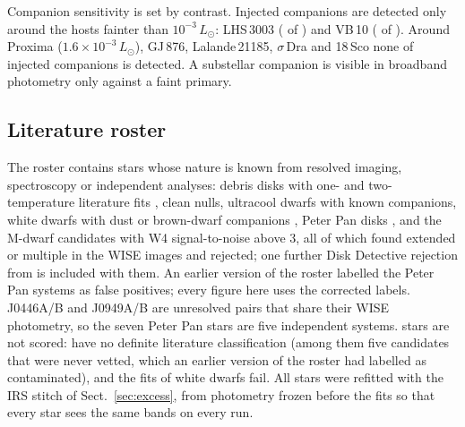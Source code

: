 \documentclass{aa}
\newcommand{\Lsun}{L_\odot}
\begin{document}
Companion sensitivity is set by contrast. Injected companions are detected only
around the \injCompDetHosts{} hosts fainter than $10^{-3}\,\Lsun$: LHS\,3003 (\injCompDetLHS{} of \injCompNLHS)
and VB\,10 (\injCompDetVB{} of \injCompNVB). Around Proxima ($1.6\times10^{-3}\,\Lsun$), GJ\,876,
Lalande\,21185, $\sigma$\,Dra and 18\,Sco none of \injCompNoDetHostsN{} injected companions is
detected. A substellar companion is visible in broadband photometry only against a
faint primary.

\subsection{Literature roster}
\label{sec:roster}

The roster contains \nRoster{} stars whose nature is known from resolved imaging,
spectroscopy or independent analyses: debris disks with one- and
two-temperature literature fits \citep{chen2014,kennedy2014}, clean nulls,
ultracool dwarfs with known companions, white dwarfs with dust or brown-dwarf
companions \citep{owens2023}, Peter Pan disks \citep{silverberg2020}, and the
\citet{theissen2014} M-dwarf candidates with W4 signal-to-noise above 3, all of
which \citet{silverberg2018} found extended or multiple in the WISE images and
rejected; one further Disk Detective rejection from \citet{silverberg2018} is
included with them. An earlier version of
the roster labelled the Peter Pan systems as false positives; every figure here
uses the corrected labels. J0446A/B and J0949A/B are unresolved pairs that share
their WISE photometry, so the seven Peter Pan stars are five independent systems.
\rosSkipped{} stars are not scored: \rosNoTruth{} have no definite literature
classification (among them five \citet{theissen2014} candidates that were never
vetted, which an earlier version of the roster had labelled as contaminated), and
the fits of \rosFitFail{} white dwarfs fail. All stars were refitted with the IRS stitch
of Sect.~\ref{sec:excess}, from photometry frozen before the fits so that every
star sees the same bands on every run.
\end{document}
